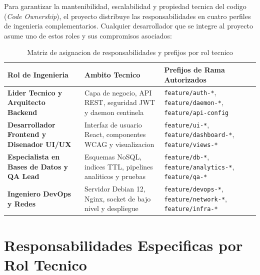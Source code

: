 \documentclass[12pt,a4paper]{report}
\begin{document}
Para garantizar la mantenibilidad, escalabilidad y propiedad tecnica del codigo (\textit{Code Ownership}), el proyecto distribuye las responsabilidades en cuatro perfiles de ingenieria complementarios. Cualquier desarrollador que se integre al proyecto asume uno de estos roles y sus compromisos asociados:

\begin{table}[htbp]
\centering
\caption{Matriz de asignacion de responsabilidades y prefijos por rol tecnico}\label{tab:roles_git}
\small
\begin{tabularx}{\textwidth}{p{3.8cm} p{3.2cm} X}
\toprule
\textbf{Rol de Ingenieria} & \textbf{Ambito Tecnico} & \textbf{Prefijos de Rama Autorizados} \\
\midrule
\textbf{Lider Tecnico y Arquitecto Backend} & Capa de negocio, API REST, seguridad JWT y daemon centinela & \texttt{feature/auth-*}, \texttt{feature/daemon-*}, \texttt{feature/api-config} \\
\midrule
\textbf{Desarrollador Frontend y Disenador UI/UX} & Interfaz de usuario React, componentes WCAG y visualizacion & \texttt{feature/ui-*}, \texttt{feature/dashboard-*}, \texttt{feature/views-*} \\
\midrule
\textbf{Especialista en Bases de Datos y QA Lead} & Esquemas NoSQL, indices TTL, pipelines analiticos y pruebas & \texttt{feature/db-*}, \texttt{feature/analytics-*}, \texttt{feature/qa-*} \\
\midrule
\textbf{Ingeniero DevOps y Redes} & Servidor Debian 12, Nginx, socket de bajo nivel y despliegue & \texttt{feature/devops-*}, \texttt{feature/network-*}, \texttt{feature/infra-*} \\
\bottomrule
\end{tabularx}
\end{table}

\section{Responsabilidades Especificas por Rol Tecnico}
\end{document}
